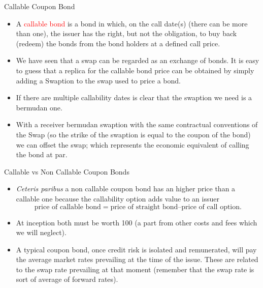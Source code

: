 \documentclass{beamer}
\begin{document}
\begin{frame}{Callable Coupon Bond}
	\begin{itemize}
		\item A \textcolor{red}{callable bond} is a bond in which, on the call date(s) (there can be more than one), the issuer has the right, but not the obligation, to buy back (redeem) the bonds from the bond holders at a defined call price.
		\item We have seen that a swap can be regarded as an exchange of bonds. It is easy to guess that a replica for the callable bond price can be obtained by simply adding a Swaption to the swap used to price a bond.
		\item If there are multiple callability dates is clear that the swaption we need is a bermudan one.
		\item With a receiver bermudan swaption with the same contractual conventions of the Swap (so the strike of the swaption is equal to the coupon of the bond) we can offset the swap; which represents the economic equivalent of calling the bond at par.
	\end{itemize}
\end{frame}

\begin{frame}{Callable vs Non Callable Coupon Bonds}
	\begin{itemize}
		\item \emph{Ceteris paribus} a non callable coupon bond has an higher price than a callable one because the callability option adds value to an issuer
		\begin{equation*}
		\text{price of callable bond} = \text{price of straight bond} – \text{price of call option}.
		\end{equation*}
		\item At inception both must be worth 100 (a part from other costs and fees which we will neglect).
		\item A typical coupon bond, once credit risk is isolated and remunerated, will pay the average market rates prevailing at the time of the issue. These are related to the swap rate prevailing at that moment (remember that the swap rate is sort of average of forward rates).
	\end{itemize}
\end{frame}
\end{document}
